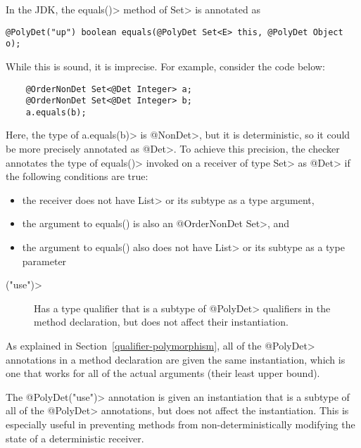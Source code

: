
In the JDK, the \<equals()> method of \<Set> is annotated as
\begin{Verbatim}
@PolyDet("up") boolean equals(@PolyDet Set<E> this, @PolyDet Object o);
\end{Verbatim}
While this is sound, it is imprecise.
For example, consider the code below:

\begin{Verbatim}
    @OrderNonDet Set<@Det Integer> a;
    @OrderNonDet Set<@Det Integer> b;
    a.equals(b);
\end{Verbatim}

Here, the type of \<a.equals(b)> is \<@NonDet>,
but it is deterministic, so it could be more precisely annotated as \<@Det>.
To achieve this precision, the checker annotates the type
of \<equals()> invoked on a receiver of type \<Set> as \<@Det> if the
following conditions are true:
\begin{itemize}
    \item the receiver does not have \<List> or its subtype as a type argument,
    \item the argument to equals() is also an \<@OrderNonDet Set>, and
    \item the argument to equals() also does not have \<List> or its subtype as a
    type parameter
\end{itemize}


\begin{description}
\item[\<("use")>]
  Has a type qualifier that is a subtype of \<@PolyDet> qualifiers in the method
  declaration, but does not affect their instantiation.
\end{description}

As explained in Section~\ref{qualifier-polymorphism},
all of the \<@PolyDet> annotations in a method declaration are given the same
instantiation, which is one that works for all of the actual arguments
(their least upper bound).

The \<@PolyDet("use")> annotation is given an instantiation that is a subtype of all of the
\<@PolyDet> annotations, but does not affect the instantiation. This is especially
useful in preventing methods from non-deterministically modifying the
state of a deterministic receiver.

